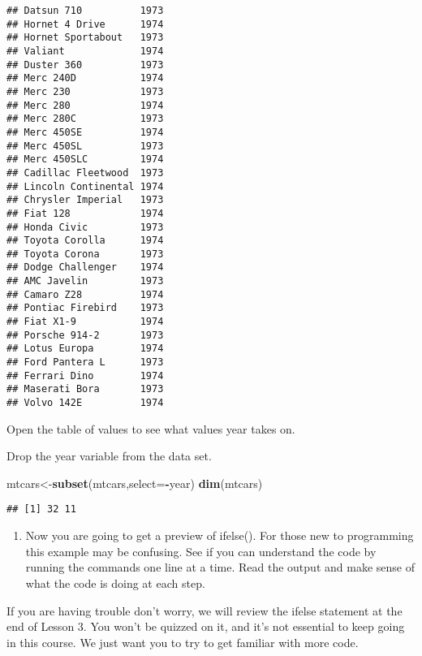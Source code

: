 \documentclass[]{article}
\newenvironment{Shaded}{\begin{snugshade}}{\end{snugshade}}
\newcommand{\KeywordTok}[1]{\textcolor[rgb]{0.13,0.29,0.53}{\textbf{#1}}}
\newcommand{\DataTypeTok}[1]{\textcolor[rgb]{0.13,0.29,0.53}{#1}}
\newcommand{\OperatorTok}[1]{\textcolor[rgb]{0.81,0.36,0.00}{\textbf{#1}}}
\newcommand{\NormalTok}[1]{#1}
\providecommand{\tightlist}{%
  \setlength{\itemsep}{0pt}\setlength{\parskip}{0pt}}
\begin{document}
\begin{verbatim}
## Datsun 710          1973
## Hornet 4 Drive      1974
## Hornet Sportabout   1973
## Valiant             1974
## Duster 360          1973
## Merc 240D           1974
## Merc 230            1973
## Merc 280            1974
## Merc 280C           1973
## Merc 450SE          1974
## Merc 450SL          1973
## Merc 450SLC         1974
## Cadillac Fleetwood  1973
## Lincoln Continental 1974
## Chrysler Imperial   1973
## Fiat 128            1974
## Honda Civic         1973
## Toyota Corolla      1974
## Toyota Corona       1973
## Dodge Challenger    1974
## AMC Javelin         1973
## Camaro Z28          1974
## Pontiac Firebird    1973
## Fiat X1-9           1974
## Porsche 914-2       1973
## Lotus Europa        1974
## Ford Pantera L      1973
## Ferrari Dino        1974
## Maserati Bora       1973
## Volvo 142E          1974
\end{verbatim}

Open the table of values to see what values year takes on.

Drop the year variable from the data set.

\begin{Shaded}
\begin{Highlighting}[]
\NormalTok{mtcars<-}\KeywordTok{subset}\NormalTok{(mtcars,}\DataTypeTok{select=}\OperatorTok{-}\NormalTok{year)}
\KeywordTok{dim}\NormalTok{(mtcars)}
\end{Highlighting}
\end{Shaded}

\begin{verbatim}
## [1] 32 11
\end{verbatim}

\begin{enumerate}
\def\labelenumi{\arabic{enumi}.}
\setcounter{enumi}{9}
\tightlist
\item
  Now you are going to get a preview of ifelse(). For those new to
  programming this example may be confusing. See if you can understand
  the code by running the commands one line at a time. Read the output
  and make sense of what the code is doing at each step.
\end{enumerate}

If you are having trouble don't worry, we will review the ifelse
statement at the end of Lesson 3. You won't be quizzed on it, and it's
not essential to keep going in this course. We just want you to try to
get familiar with more code.

\begin{Shaded}
\end{Shaded}
\end{document}
